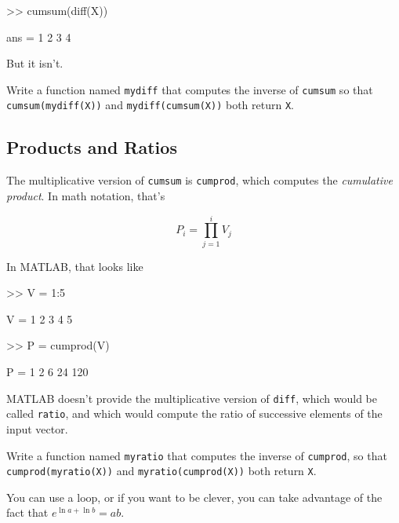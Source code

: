 \begin{code}
>> cumsum(diff(X))

ans = 1     2     3     4
\end{code}

But it isn't.

\begin{ex}
Write a function named \lstinline{mydiff} that computes the
inverse of \lstinline{cumsum} so that \lstinline{cumsum(mydiff(X))} and
\lstinline{mydiff(cumsum(X))} both return \lstinline{X}.

\end{ex}


\subsection{Products and Ratios}

The multiplicative version of \lstinline{cumsum} is \lstinline{cumprod},
which computes the \emph{cumulative product}.  In math notation,
that's


\begin{equation*}
P_i = \prod_{j=1}^i V_j
\end{equation*}

In MATLAB, that looks like

\begin{code}
>> V = 1:5

V = 1     2     3     4     5

>> P = cumprod(V)

P = 1     2     6    24   120
\end{code}

MATLAB doesn't provide the multiplicative version
of \lstinline{diff}, which would be called \lstinline{ratio}, and which would
compute the ratio of successive elements of the input vector.

\begin{ex}
Write a function named \lstinline{myratio} that computes the
inverse of \lstinline{cumprod}, so that \lstinline{cumprod(myratio(X))} and
\lstinline{myratio(cumprod(X))} both
return \lstinline{X}.

You can use a loop, or if you want to be clever, you can take
advantage of the fact that $e^{\ln a + \ln b} = a b$.


\end{ex}


